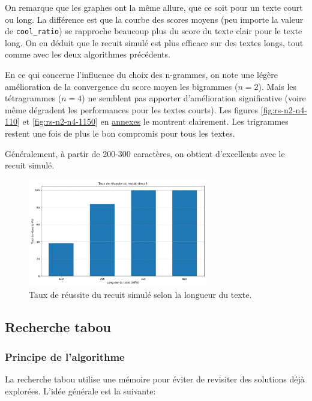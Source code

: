 \documentclass[a4paper]{article}
\begin{document}
On remarque que les graphes ont la même allure, que ce soit pour un texte court ou long. La différence est que la courbe des scores moyens (peu importe la valeur de \texttt{cool\_ratio}) se rapproche beaucoup plus du score du texte clair pour le texte long.
On en déduit que le recuit simulé est plus efficace sur des textes longs, tout comme avec les deux algorithmes précédents.


En ce qui concerne l'influence du choix des n-grammes, on note une légère amélioration de la convergence du score moyen les bigrammes ($n=2$). Mais les tétragrammes ($n=4$) ne semblent pas apporter d'amélioration significative (voire même dégradent les performances pour les textes courts). 
Les figures \ref{fig:rs-n2-n4-110} et \ref{fig:rs-n2-n4-1150} en \hyperref[sec:annexes]{annexes} le montrent clairement. Les trigrammes restent une fois de plus le bon compromis pour tous les textes.

Généralement, à  partir de 200-300 caractères, on obtient d'excellents avec le recuit simulé.

\begin{figure}[H]
    \centering
    \includegraphics[width=0.7\textwidth, keepaspectratio, height=0.6 \textheight]{taux_reussite_rs.png}
    \caption{Taux de réussite du recuit simulé selon la longueur du texte.}
    \label{fig:taux_reussite_rs}
\end{figure}


\subsection{Recherche tabou}
\subsubsection{Principe de l’algorithme}
La recherche tabou utilise une mémoire pour éviter de revisiter des solutions déjà explorées. L'idée générale est la suivante:
\end{document}
